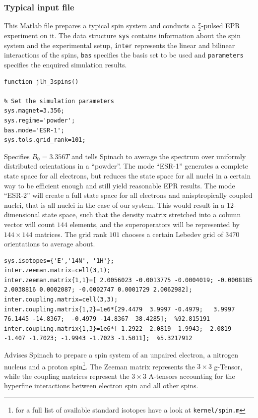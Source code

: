\documentclass[11.5pt,a4paper]{article}
\begin{document}
\subsubsection{Typical input file}
\label{sec-input-file}
This Matlab file prepares a typical spin system and conducts a $\tfrac{\pi}{2}$-pulsed EPR experiment on it. The data structure \verb$sys$ contains information about the spin system and the experimental setup, \verb$inter$ represents the linear and bilinear interactions of the spins, \verb$bas$ specifies the basis set to be used and \verb$parameters$ specifies the enquired simulation results. 
\begin{lstlisting}
function jlh_3spins()

% Set the simulation parameters
sys.magnet=3.356;
sys.regime='powder';
bas.mode='ESR-1';
sys.tols.grid_rank=101;
\end{lstlisting} 
Specifies $B_0 = 3.356 T$ and tells Spinach to average the spectrum over uniformly distributed orientations in a ``powder''. The mode ``ESR-1'' generates a complete state space for all electrons, but reduces the state space for all nuclei in a certain way to be efficient enough and still yield reasonable EPR results. 
The mode ``ESR-2'' will create a full state space for all electrons and anisptropically coupled nuclei, that is all nuclei in the case of our system. This would result in a $12$-dimensional state space, such that the density matrix stretched into a column vector will count $144$ elements, and the superoperators will be represented by $144\times144$ matrices. The grid rank $101$ chooses a certain Lebedev grid of $3470$ orientations to average about.
\begin{lstlisting}[firstnumber=last]
% Interactions
sys.isotopes={'E','14N', '1H'};
inter.zeeman.matrix=cell(3,1);
inter.zeeman.matrix{1,1}=[ 2.0056023 -0.0013775 -0.0004019; -0.0008185 2.0038816 0.0002087; -0.0002747 0.0001729 2.0062982];
inter.coupling.matrix=cell(3,3);
inter.coupling.matrix{1,2}=1e6*[29.4479  3.9997 -0.4979;   3.9997  76.1445 -14.8367;  -0.4979 -14.8367  38.4285];  %92.815191
inter.coupling.matrix{1,3}=1e6*[-1.2922  2.0819 -1.9943;  2.0819  -1.407 -1.7023; -1.9943 -1.7023 -1.5011];  %5.3217912
\end{lstlisting}
Advises Spinach to prepare a spin system of an unpaired electron, a nitrogen nucleus and a proton spin\footnote{for a full list of available standard isotopes have a look at \verb$kernel/spin.m$}. The Zeeman matrix represents the $3\times 3$ g-Tensor, while the coupling matrices represent the $3\times 3$ A-tensors accounting for the hyperfine interactions between electron spin and all other spins.
\end{document}
